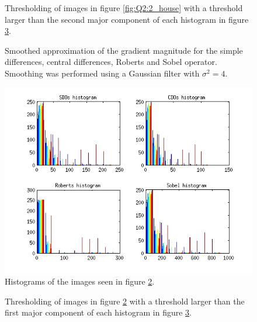 \begin{figure}[H]
	\centering
	\scalebox{0.9}{}
	\caption{Thresholding of images in figure \ref{fig:Q2:2_house} with a threshold larger than the second major component of 
	each histogram in figure \ref{fig:Q2:histogram_house}.}
	\label{fig:Q2:threshold_house_2}
\end{figure}


\begin{figure}[H]
	\centering
	\scalebox{0.7}{}
	\caption{Smoothed approximation of the gradient magnitude for the simple differences, central differences, Roberts and Sobel operator. Smoothing
	was performed using a Gaussian filter with $\sigma^2 = 4$.}
	\label{fig:Q2:2_house_smoothed}
\end{figure}

\begin{figure}[H]
	\centering
	\includegraphics[scale=0.8]{./images/Q2/house_smoothed/histogram_2.png}
	\caption{Histograms of the images seen in figure \ref{fig:Q2:2_house_smoothed}.}
	\label{fig:Q2:histogram_house}
\end{figure}


\begin{figure}[H]
	\centering
	\scalebox{0.9}{}
	\caption{Thresholding of images in figure \ref{fig:Q2:2_house_smoothed} with a threshold larger than the first major component of 
	each histogram in figure \ref{fig:Q2:histogram_house}.}
	\label{fig:Q2:threshold_house_1}
\end{figure}

